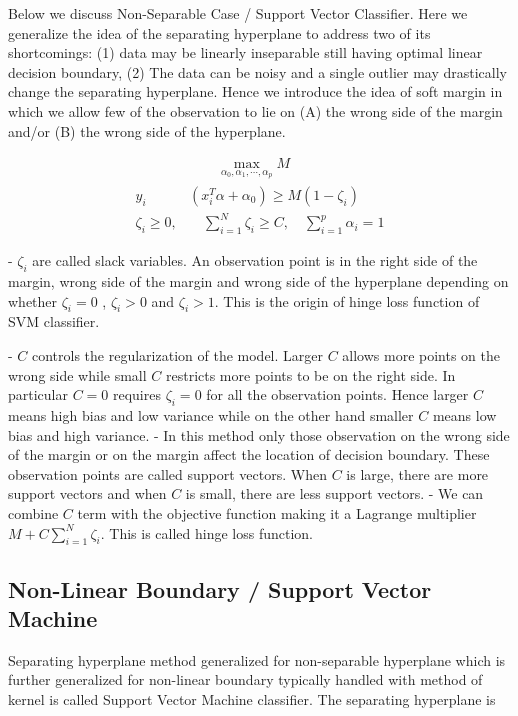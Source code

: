 \documentclass[11pt]{article}
\theoremstyle{definition}
\begin{document}
Below we discuss Non-Separable Case / Support Vector Classifier. Here we generalize the idea of the separating hyperplane to address two of its shortcomings: (1) data may be linearly inseparable still having optimal linear decision boundary, (2) The data can be noisy and a single outlier may drastically change the separating hyperplane. Hence we introduce the idea of soft margin in which we allow few of the observation to lie on (A) the wrong side of the margin and/or (B) the wrong side of the hyperplane. 


$$
\begin{align}\nonumber
 & \qquad \max_{\alpha_0, \alpha_1, \cdots, \alpha_p} M  \\\nonumber
 y_i & (x_i^T\alpha + \alpha_0) \geqslant M(1-\zeta_i)  \\
\zeta_i \geqslant 0, & \quad \sum_{i=1}^N \zeta_i \geqslant C, \quad \sum_{i=1}^p \alpha_i = 1
\end{align}
$$


- $\zeta_i$ are called slack variables. An observation point is in the right side of the margin, wrong side of the margin and wrong side of the hyperplane depending on whether $\zeta_i = 0$ , $\zeta_i > 0$ and $\zeta_i > 1$. This is the origin of hinge loss function of SVM classifier.  

- $C$ controls the regularization of the model. Larger $C$ allows more points on the wrong side while small $C$ restricts more points to be on the right side. In particular $C=0$ requires $\zeta_i = 0$ for all the observation points. Hence larger $C$ means high bias and low variance while on the other hand smaller $C$ means low bias and high variance.  
- In this method only those observation on the wrong side of the margin or on the margin affect the location of decision boundary. These observation points are called support vectors. When $C$ is large, there are more support vectors and when $C$ is small, there are less support vectors. 
- We can combine $C$ term with the objective function making it a Lagrange multiplier $M + C \sum_{i=1}^N \zeta_i$. This is called hinge loss function. 



\subsection{Non-Linear Boundary / Support Vector Machine }



Separating hyperplane method generalized for non-separable hyperplane which is further generalized for non-linear boundary typically handled with method of kernel is called Support Vector Machine classifier. The separating hyperplane is 
\end{document}
